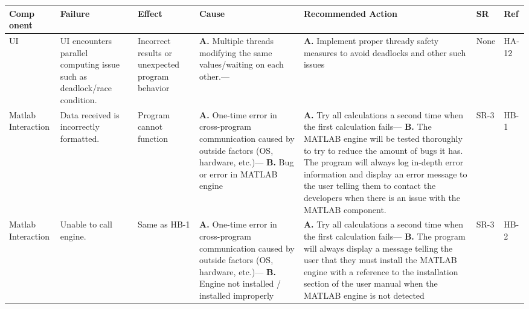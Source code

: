 \documentclass{article}
\begin{document}
    \begin{table}[H]
        \begin{tabular}{|p{} | p{} | p{} | p{} | p{} | p{} | p{}|}
        \toprule
        \textbf{Comp onent} & \textbf{Failure} & \textbf{Effect} & \textbf{Cause} & \textbf{Recommended Action} & \textbf{SR} & \textbf{Ref}\\
    \midrule
    UI& UI encounters parallel computing issue such as deadlock/race condition.
    & Incorrect results or unexpected program behavior
    & \textbf{A.} Multiple threads modifying the same values/waiting on each other.---
    & \textbf{A.} Implement proper thready safety measures to avoid deadlocks and other such issues
    &None & HA-12\\
    \midrule
    Matlab Interaction& Data received is incorrectly formatted.
    & Program cannot function
    & \textbf{A.} One-time error in cross-program communication caused by outside factors (OS, hardware, etc.)---
      \textbf{B.} Bug or error in MATLAB engine
    & \textbf{A.} Try all calculations a second time when the first calculation fails---
      \textbf{B.} The MATLAB engine will be tested thoroughly to try to reduce the amount of bugs it has. 
      The program will always log in-depth error information and display an error message to the user telling them to contact the developers when 
      there is an issue with the MATLAB component.     
    &SR-3 &HB-1\\
    \midrule
    Matlab Interaction& Unable to call engine.
      & Same as HB-1
      & \textbf{A.} One-time error in cross-program communication caused by outside factors (OS, hardware, etc.)---
        \textbf{B.} Engine not installed / installed improperly 
      & \textbf{A.} Try all calculations a second time when the first calculation fails---
        \textbf{B.} The program will always display a message telling the user that they must install the MATLAB engine with a reference 
        to the installation section of the user manual when the MATLAB engine is not detected 
      &SR-3 & HB-2\\
    \bottomrule
      \end{tabular}
      \end{table}
      \pagebreak
\end{document}
